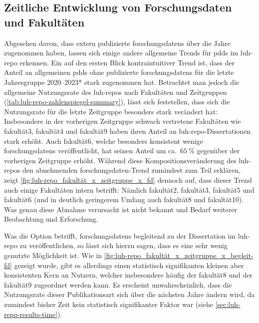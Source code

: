 \subsection{Zeitliche Entwicklung von Forschungsdaten und Fakultäten}
Abgesehen davon, dass extern publizierte \glspl{forschungsdaten} über die Jahre zugenommen haben, lassen sich einige andere allgemeine Trends für \glspl{pdd} im \gls{luh-repo} erkennen.
Ein auf den ersten Blick kontraintuitiver Trend ist, dass der Anteil an allgemeinen \glspl{pdd} ohne publizierte \glspl{forschungsdaten} für die letzte Jahresgruppe 2020--2023* stark zugenommen hat.
Betrachtet man jedoch die allgemeine Nutzungsrate des \gls{luh-repo}s nach Fakultäten und Zeitgruppen (\cref{tab:luh-repo-zahlenspiegel-summary}), lässt sich feststellen, dass sich die Nutzungsrate für die letzte Zeitgruppe besonders stark verändert hat:
Insbesondere in der vorherigen Zeitgruppe schwach vertretene Fakultäten wie \gls{fakultät3}, \gls{fakultät4} und \gls{fakultät9} haben ihren Anteil an \gls{luh-repo}-Dissertationen stark erhöht.
Auch \gls{fakultät6}, welche besonders konsistent wenige \glspl{forschungsdaten} veröffentlicht, hat seinen Anteil um ca.~$\SI{65}{\percent}$ gegenüber der vorherigen Zeitgruppe erhöht.
Während diese Kompositionsveränderung des \gls{luh-repo}s den abnehmenden \gls{forschungsdaten}-Trend zumindest zum Teil erklären, zeigt \cref{fig:luh-repo_fakultät_x_zeitgruppe_x_fd} dennoch auf, dass dieser Trend auch einige Fakultäten intern betrifft:
Nämlich \gls{fakultät2}, \gls{fakultät3}, \gls{fakultät5} und \gls{fakultät6} (und in deutlich geringerem Umfang auch \gls{fakultät8} und \gls{fakultät10}).
Was genau diese Abnahme verursacht ist nicht bekannt und Bedarf weiterer Beobachtung und Erforschung.

Was die Option betrifft, \glspl{forschungsdaten} begleitend zu der Dissertation im \gls{luh-repo} zu veröffentlichen, so lässt sich hierzu sagen, dass es eine sehr wenig genutzte Möglichkeit ist.
Wie in \cref{fig:luh-repo_fakultät_x_zeitgruppe_x_begleit-fd} gezeigt wurde, gibt es allerdings einen statistisch signifikanten kleinen aber konsistenten Kern an Nutzern, welcher insbesondere häufig der \gls{fakultät8} und der \gls{fakultät9} zugeordnet werden kann.
Es erscheint unwahrscheinlich, dass die Nutzungsrate dieser Publikationsart sich über die nächsten Jahre ändern wird, da zumindest bisher Zeit kein statistisch signifikanter Faktor war (siehe \cref{sec:luh-repo-results-time}).

